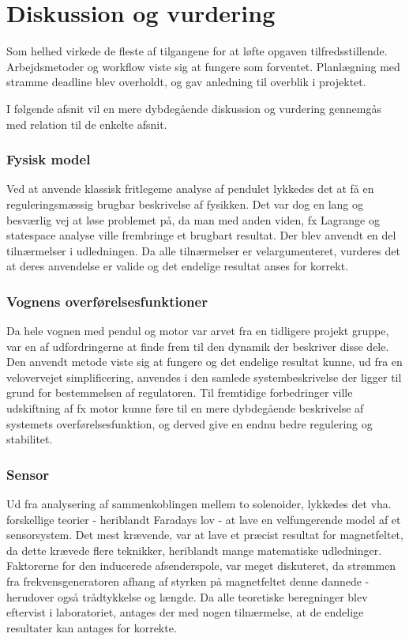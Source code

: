 \chapter{Diskussion og vurdering}\label{kap:diskussion}
Som helhed virkede de fleste af tilgangene for at løfte opgaven tilfredsstillende.
Arbejdsmetoder og workflow viste sig at fungere som forventet.
Planlægning med stramme deadline blev overholdt, og gav anledning til overblik i projektet.

I følgende afsnit vil en mere dybdegående diskussion og vurdering gennemgås med relation til de enkelte afsnit. 

\subsection{Fysisk model}
Ved at anvende klassisk fritlegeme analyse af pendulet lykkedes det at få en reguleringsmæssig brugbar beskrivelse af fysikken. 
Det var dog en lang og besværlig vej at løse problemet på, da man med anden viden, fx Lagrange og statespace analyse ville frembringe et brugbart resultat.
Der blev anvendt en del tilnærmelser i udledningen. 
Da alle tilnærmelser er velargumenteret, vurderes det at deres anvendelse er valide og det endelige resultat anses for korrekt.   

\subsection{Vognens overførelsesfunktioner}
Da hele vognen med pendul og motor var arvet fra en tidligere projekt gruppe, var en af udfordringerne at finde frem til den dynamik der beskriver disse dele.
Den anvendt metode viste sig at fungere og det endelige resultat kunne, ud fra en velovervejet simplificering, anvendes i den samlede systembeskrivelse der ligger til grund for bestemmelsen af regulatoren.
Til fremtidige forbedringer ville udskiftning af fx motor kunne føre til en mere dybdegående beskrivelse af systemets overførelsesfunktion, og derved give en endnu bedre regulering og stabilitet.

\subsection{Sensor}
Ud fra analysering af sammenkoblingen mellem to solenoider, lykkedes det vha. forskellige teorier - heriblandt Faradays lov - at lave en velfungerende model af et sensorsystem. 
Det mest krævende, var at lave et præcist resultat for magnetfeltet, da dette krævede flere teknikker, heriblandt mange matematiske udledninger.
Faktorerne for den inducerede afsenderspole, var meget diskuteret, da strømmen fra frekvensgeneratoren afhang af styrken på magnetfeltet denne dannede - herudover også trådtykkelse og længde. 
Da alle teoretiske beregninger blev eftervist i laboratoriet, antages der med nogen tilnærmelse, at de endelige resultater kan antages for korrekte.

